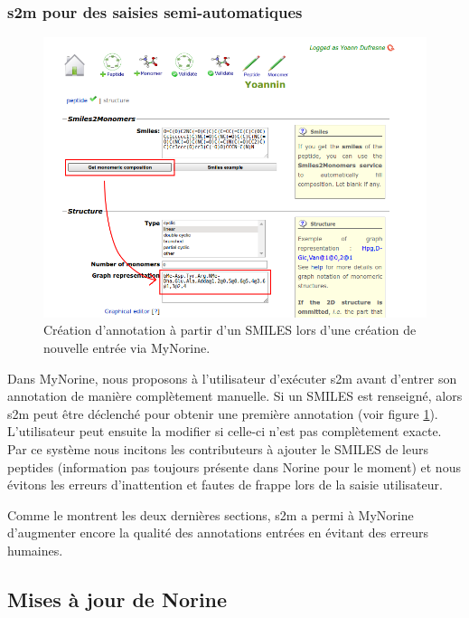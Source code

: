 \subsubsection{s2m pour des saisies semi-automatiques}

\begin{figure}[h!]
  \begin{center}
    \includegraphics[width=450px]{Figures/contributions/s2m_automatic.png}
    \caption{\label{s2m_automatic}Création d'annotation à partir d'un SMILES lors d'une création de nouvelle entrée via MyNorine.}
  \end{center}
\end{figure}

Dans MyNorine, nous proposons à l'utilisateur d'exécuter s2m avant d'entrer son annotation de manière complètement manuelle.
Si un SMILES est renseigné, alors s2m peut être déclenché pour obtenir une première annotation (voir figure \ref{s2m_automatic}).
L'utilisateur peut ensuite la modifier si celle-ci n'est pas complètement exacte.
Par ce système nous incitons les contributeurs à ajouter le SMILES de leurs peptides (information pas toujours présente dans Norine pour le moment) et nous évitons les erreurs d'inattention et fautes de frappe lors de la saisie utilisateur.

Comme le montrent les deux dernières sections, s2m a permi à MyNorine d'augmenter encore la qualité des annotations entrées en évitant des erreurs humaines.




\subsection{Mises à jour de Norine}


